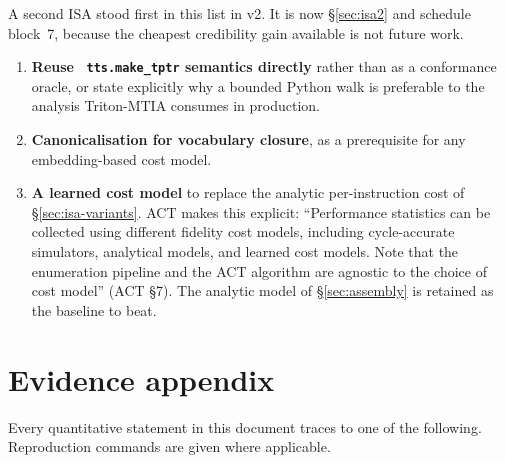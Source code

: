 \documentclass[11pt,a4paper]{article}
\newcommand{\code}[1]{\texttt{\small\hyphenchar\font=45 #1}}
\begin{document}
\noindent A second ISA stood first in this list in v2. It is now \S\ref{sec:isa2} and schedule block~7,
because the cheapest credibility gain available is not future work.

\begin{enumerate}[leftmargin=1.5em,itemsep=0.3em]
\item \textbf{Reuse \code{tts.make\_tptr} semantics directly} rather than as a conformance oracle, or state
      explicitly why a bounded Python walk is preferable to the analysis Triton-MTIA consumes in production.
\item \textbf{Canonicalisation for vocabulary closure}, as a prerequisite for any embedding-based cost model.
\item \textbf{A learned cost model} to replace the analytic per-instruction cost of
      \S\ref{sec:isa-variants}. ACT makes this explicit: ``Performance statistics can be collected using
      different fidelity cost models, including cycle-accurate simulators, analytical models, and learned
      cost models. Note that the enumeration pipeline and the ACT algorithm are agnostic to the choice of
      cost model'' (ACT \S7). The analytic model of \S\ref{sec:assembly} is retained as the baseline to beat.
\end{enumerate}

\appendix

\section{Evidence appendix}\label{app:evidence}

Every quantitative statement in this document traces to one of the following. Reproduction commands are
given where applicable.
\end{document}
